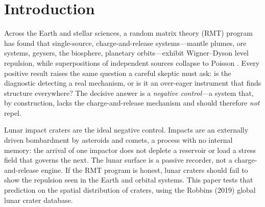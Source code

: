 \documentclass[12pt,a4paper]{article}
\begin{document}
\begin{abstract}
\vspace{0.8em}
\noindent\textbf{Keywords:} random matrix theory; negative control; lunar craters; complete spatial randomness; nearest-neighbor statistics; Clark--Evans; secondary craters; point processes; impact bombardment

\vspace{0.4em}
\noindent\textbf{Code and data:} \url{https://github.com/Ruqing1963/lunar-crater-rmt-baseline}

\vspace{0.2em}
\noindent\textbf{Companion studies:} stratigraphy \url{https://zenodo.org/records/20774581}; seismotectonics \url{https://zenodo.org/records/20768130}; mantle plumes \url{https://zenodo.org/records/20768420}; metallogeny \url{https://zenodo.org/records/20768849}; evolution \url{https://zenodo.org/records/20783763}; hydrogeology \url{https://zenodo.org/records/20780389}; solar flares \url{https://zenodo.org/records/20784967}; orbital architecture \url{https://zenodo.org/records/20785613}
\end{abstract}

\section{Introduction}

Across the Earth and stellar sciences, a random matrix theory (RMT) program has found that single-source, charge-and-release systems---mantle plumes, ore systems, geysers, the biosphere, planetary orbits---exhibit Wigner--Dyson level repulsion, while superpositions of independent sources collapse to Poisson \citep{chen2026plume,chen2026metal,chen2026hydro,chen2026evo,chen2026orbital}. Every positive result raises the same question a careful skeptic must ask: is the diagnostic detecting a real mechanism, or is it an over-eager instrument that finds structure everywhere? The decisive answer is a \emph{negative control}---a system that, by construction, lacks the charge-and-release mechanism and should therefore \emph{not} repel.

Lunar impact craters are the ideal negative control. Impacts are an externally driven bombardment by asteroids and comets, a process with no internal memory: the arrival of one impactor does not deplete a reservoir or load a stress field that governs the next. The lunar surface is a passive recorder, not a charge-and-release engine. If the RMT program is honest, lunar craters should fail to show the repulsion seen in the Earth and orbital systems. This paper tests that prediction on the spatial distribution of craters, using the Robbins (2019) global lunar crater database.
\end{document}
